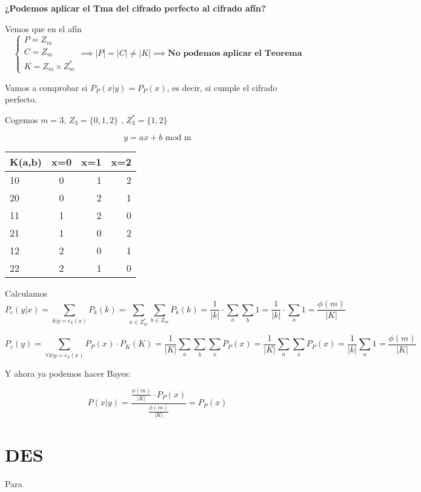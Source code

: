 \begin{example}
	
	\textbf{¿Podemos aplicar el Tma del cifrado perfecto al cifrado afín?}
	
	Vemos que en el afín
	$$\begin{cases}
	P = Z_m\\
	C= Z_m\\
	K = Z_m \times Z_m^*
	\end{cases} \implies|P| = |C| \neq |K| \implies \textbf{No podemos aplicar el Teorema}$$ 
	
	Vamos a comprobar si $P_P(x|y) = P_P(x)$, es decir, si cumple el cifrado perfecto.
	
	Cogemos $m = 3$, $Z_3 = \{0,1,2\}$ , $Z_3^* = \{1,2\}$
	
	\begin{center}
		$$y = ax + b \text{ mod m}$$
		\begin{tabular}{l | c | r | r}
			K(a,b) & x=0 & x=1 & x=2\\
			\hline
			10 & 0 & 1 & 2\\
			\hline
			20 & 0 & 2 & 1\\
			\hline
			11 & 1 & 2 & 0\\
			\hline
			21 & 1 & 0 & 2\\
			\hline
			12 & 2 & 0 & 1\\
			\hline
			22 & 2 & 1 & 0
			
		\end{tabular}
	\end{center}
	
	Calculamos $$P_c(y|x) = \sum_{k|y=e_k(x)} P_k(k) = \sum_{a\in Z_m^*}\sum_{b \in Z_m} P_k(k) = \frac{1}{|k|}\cdot \sum_a \sum_b 1 = \frac{1}{|k|}\cdot \sum_a 1 = \frac{\phi(m)}{|K|}$$
	
	$$P_c(y) = \sum_{\forall k|y=e_k(x)} P_P(x) \cdot P_K(K) = \frac{1}{|K|} \sum_a \sum_b \sum_x P_P(x) = \frac{1}{|K|} \sum_a \sum_x P_P(x) = \frac{1}{|k|} \sum_a 1 = \frac{\phi(m)}{|K|}$$
	
	Y ahora ya podemos hacer Bayes:
	
	$$P(x|y) = \frac{\frac{\phi(m)}{|K|}\cdot P_P(x)}{\frac{\phi(m)}{|K|}} = P_P(x)$$
\end{example}

\chapter{DES}
Para 